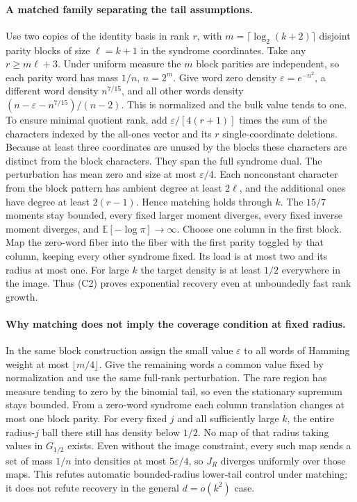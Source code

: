 \paragraph{A matched family separating the tail assumptions.}
Use two copies of the identity basis in rank $r$, with $m=\lceil\log_2(k+2)\rceil$ disjoint parity blocks of size $\ell=k+1$ in the syndrome coordinates. Take any $r\ge m\ell+3$. Under uniform measure the $m$ block parities are independent, so each parity word has mass $1/n$, $n=2^m$. Give word zero density $\varepsilon=e^{-n^2}$, a different word density $n^{7/15}$, and all other words density $(n-\varepsilon-n^{7/15})/(n-2)$. This is normalized and the bulk value tends to one. To ensure minimal quotient rank, add $\varepsilon/[4(r+1)]$ times the sum of the characters indexed by the all-ones vector and its $r$ single-coordinate deletions. Because at least three coordinates are unused by the blocks these characters are distinct from the block characters. They span the full syndrome dual. The perturbation has mean zero and size at most $\varepsilon/4$. Each nonconstant character from the block pattern has ambient degree at least $2\ell$, and the additional ones have degree at least $2(r-1)$. Hence matching holds through $k$.
The $15/7$ moments stay bounded, every fixed larger moment diverges, every fixed inverse moment diverges, and $\mathbb E[-\log\pi]\to\infty$. Choose one column in the first block. Map the zero-word fiber into the fiber with the first parity toggled by that column, keeping every other syndrome fixed. Its load is at most two and its radius at most one. For large $k$ the target density is at least $1/2$ everywhere in the image. Thus (C2) proves exponential recovery even at unboundedly fast rank growth.

\paragraph{Why matching does not imply the coverage condition at fixed radius.}
In the same block construction assign the small value $\varepsilon$ to all words of Hamming weight at most $\lfloor m/4\rfloor$. Give the remaining words a common value fixed by normalization and use the same full-rank perturbation. The rare region has measure tending to zero by the binomial tail, so even the stationary supremum stays bounded. From a zero-word syndrome each column translation changes at most one block parity. For every fixed $j$ and all sufficiently large $k$, the entire radius-$j$ ball there still has density below $1/2$. No map of that radius taking values in $G_{1/2}$ exists. Even without the image constraint, every such map sends a set of mass $1/n$ into densities at most $5\varepsilon/4$, so $J_R$ diverges uniformly over those maps. This refutes automatic bounded-radius lower-tail control under matching; it does not refute recovery in the general $d=o(k^2)$ case.
